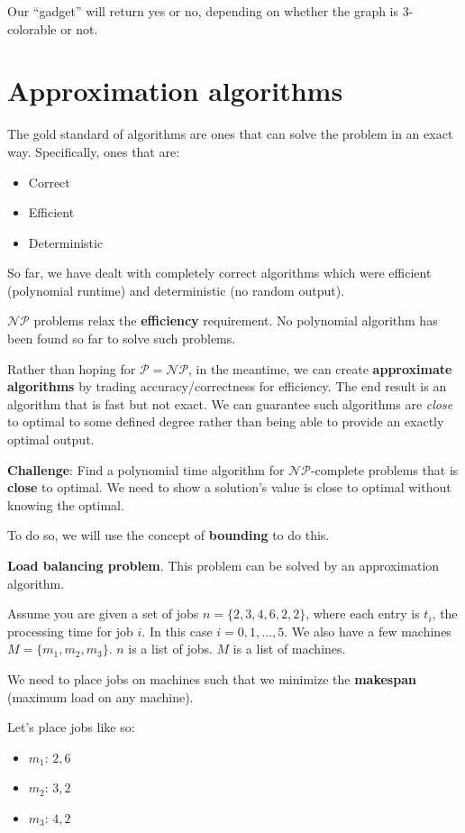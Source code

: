 \documentclass{article}
\begin{document}
Our ``gadget'' will return yes or no, depending on whether the graph is 3-colorable or not.

\section{Approximation algorithms}
The gold standard of algorithms are ones that can solve the problem in an exact way. Specifically, ones that are:
\begin{itemize}
    \item Correct
    \item Efficient
    \item Deterministic
\end{itemize}

So far, we have dealt with completely correct algorithms which were efficient (polynomial runtime) and deterministic (no random output).

$\mathcal{NP}$ problems relax the \textbf{efficiency} requirement. No polynomial algorithm has been found so far to solve such problems.

Rather than hoping for $\mathcal{P} = \mathcal{NP}$, in the meantime, we can create \textbf{approximate algorithms} by trading accuracy/correctness for efficiency. The end result is an algorithm that is fast but not exact. We can guarantee such algorithms are \textit{close} to optimal to some defined degree rather than being able to provide an exactly optimal output.

\textbf{Challenge}: Find a polynomial time algorithm for $\mathcal{NP}$-complete problems that is \textbf{close} to optimal. We need to show a solution's value is close to optimal without knowing the optimal.

To do so, we will use the concept of \textbf{bounding} to do this.

\textbf{Load balancing problem}. This problem can be solved by an approximation algorithm.

Assume you are given a set of jobs $n = \{2, 3, 4, 6, 2, 2\}$, where each entry is $t_i$, the processing time for job $i$. In this case $i = 0, 1, \dots, 5$. We also have a few machines $M = \{m_1, m_2, m_3\}$. $n$ is a list of jobs. $M$ is a list of machines.

We need to place jobs on machines such that we minimize the \textbf{makespan} (maximum load on any machine).

Let's place jobs like so:

\begin{itemize}
    \item $m_1$: $2, 6$
    \item $m_2$: $3, 2$
    \item $m_3$: $4, 2$
\end{itemize}
\end{document}
